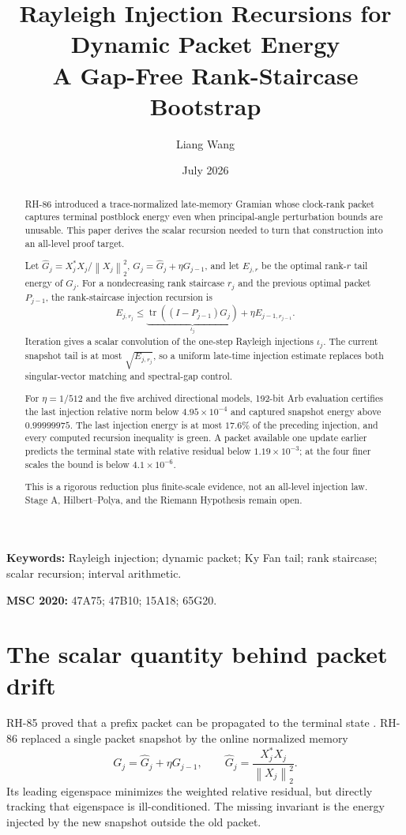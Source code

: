 \documentclass[11pt]{article}
\title{Rayleigh Injection Recursions for Dynamic Packet Energy\\
\large A Gap-Free Rank-Staircase Bootstrap}
\author{Liang Wang}
\date{July 2026}
\theoremstyle{remark}
\newcommand{\norm}[1]{\left\lVert#1\right\rVert}
\begin{document}
\maketitle

\begin{abstract}
RH-86 introduced a trace-normalized late-memory Gramian whose clock-rank
packet captures terminal postblock energy even when principal-angle
perturbation bounds are unusable.  This paper derives the scalar recursion
needed to turn that construction into an all-level proof target.

Let $\widehat G_j=X_j^*X_j/\norm{X_j}_2^2$,
$G_j=\widehat G_j+\eta G_{j-1}$, and let $E_{j,r}$ be the optimal rank-$r$
tail energy of $G_j$.  For a nondecreasing rank staircase $r_j$ and the
previous optimal packet $P_{j-1}$, the rank-staircase injection recursion is
\[
 E_{j,r_j}\le
 \underbrace{\operatorname{tr}((I-P_{j-1})\widehat G_j)}_{\iota_j}
 +\eta E_{j-1,r_{j-1}}.
\]
Iteration gives a scalar convolution of the one-step Rayleigh injections
$\iota_j$.  The current snapshot tail is at most $\sqrt{E_{j,r_j}}$, so a
uniform late-time injection estimate replaces both singular-vector matching
and spectral-gap control.

For $\eta=1/512$ and the five archived directional models, 192-bit Arb
evaluation certifies the last injection relative norm below
$4.95\times10^{-4}$ and captured snapshot energy above $0.99999975$.  The
last injection energy is at most $17.6\%$ of the preceding injection, and
every computed recursion inequality is green.  A packet available one update
earlier predicts the terminal state with relative residual below
$1.19\times10^{-3}$; at the four finer scales the bound is below
$4.1\times10^{-6}$.

This is a rigorous reduction plus finite-scale evidence, not an all-level
injection law.  Stage A, Hilbert--Polya, and the Riemann Hypothesis remain
open.
\end{abstract}

\noindent\textbf{Keywords:} Rayleigh injection; dynamic packet; Ky Fan tail;
rank staircase; scalar recursion; interval arithmetic.

\medskip
\noindent\textbf{MSC 2020:} 47A75; 47B10; 15A18; 65G20.

\section{The scalar quantity behind packet drift}

RH-85 proved that a prefix packet can be propagated to the terminal state
\citep{WangSnapshot2026}.  RH-86 replaced a single packet snapshot by the
online normalized memory
\citep{WangMemory2026}
\[
 G_j=\widehat G_j+\eta G_{j-1},\qquad
 \widehat G_j=\frac{X_j^*X_j}{\norm{X_j}_2^2}.
\]
Its leading eigenspace minimizes the weighted relative residual, but directly
tracking that eigenspace is ill-conditioned.  The missing invariant is the
energy injected by the new snapshot outside the old packet.
\end{document}
